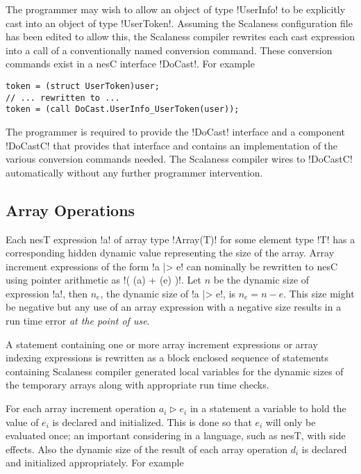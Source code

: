 The programmer may wish to allow an object of type !UserInfo! to be explicitly cast into an
object of type !UserToken!. Assuming the Scalaness configuration file has been edited to allow
this, the Scalaness compiler rewrites each cast expression into a call of a conventionally named
conversion command. These conversion commands exist in a nesC interface !DoCast!. For example

\singlespace
\vspace{1.0ex}
\begin{lstlisting}[language=nesC]
token = (struct UserToken)user;
// ... rewritten to ...
token = (call DoCast.UserInfo_UserToken(user));
\end{lstlisting}
\vspace{1.0ex}
\primaryspacing

The programmer is required to provide the !DoCast! interface and a component !DoCastC! that
provides that interface and contains an implementation of the various conversion commands
needed. The Scalaness compiler wires to !DoCastC! automatically without any further programmer
intervention.


\subsection{Array Operations}
\label{section-array-operations}

Each nesT expression !a! of array type !Array(T)! for some element type !T! has a corresponding
hidden dynamic value representing the size of the array. Array increment expressions of the form
!a |> e! can nominally be rewritten to nesC using pointer arithmetic as !( (a) + (e) )!. Let $n$
be the dynamic size of expression !a!, then $n_e$, the dynamic size of !a |> e!, is $n_e = n -
e$. This size might be negative but any use of an array expression with a negative size results
in a run time error \emph{at the point of use}.

A statement containing one or more array increment expressions or array indexing expressions is
rewritten as a block enclosed sequence of statements containing Scalaness compiler generated
local variables for the dynamic sizes of the temporary arrays along with appropriate run time
checks.

For each array increment operation $a_i \rhd e_i$ in a statement a variable to hold the value of
$e_i$ is declared and initialized. This is done so that $e_i$ will only be evaluated once; an
important considering in a language, such as nesT, with side effects. Also the dynamic size of
the result of each array operation $d_i$ is declared and initialized appropriately. For example

